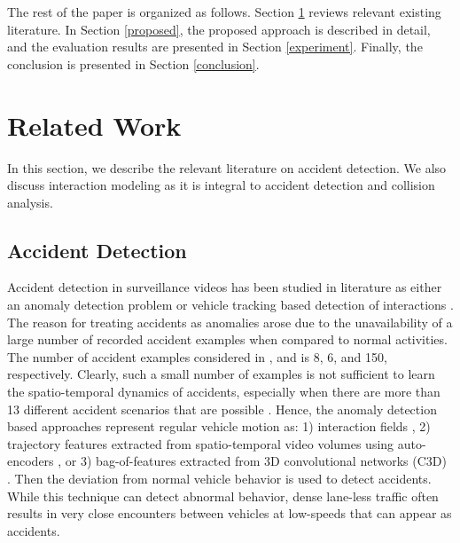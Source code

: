 \documentclass[final,journal]{IEEEtran}
\begin{document}
The rest of the paper is organized as follows. Section \ref{related} reviews relevant existing literature. In Section \ref{proposed}, the proposed approach is described in detail, and the evaluation results are presented in Section \ref{experiment}. Finally, the conclusion is presented in Section \ref{conclusion}.

\section{Related Work}\label{related}

In this section, we describe the relevant literature on accident detection. We also discuss interaction modeling as it is integral to accident detection and collision analysis.

\subsection{Accident Detection}
Accident detection in surveillance videos has been studied in literature as either an anomaly detection problem \cite{accident_anomaly3,accident_anomaly2, accident_anomaly1} or vehicle tracking based detection of interactions \cite{anticipating1, cadp, accident_anticipating2}. The reason for treating accidents as anomalies arose due to the unavailability of a large number of recorded accident examples when compared to normal activities. The number of accident examples considered in \cite{accident_anomaly3}, \cite{accident_anomaly2} and \cite{accident_anomaly1} is 8, 6, and 150, respectively. Clearly, such a small number of examples is not sufficient to learn the spatio-temporal dynamics of accidents, especially when there are more than 13 different accident scenarios that are possible \cite{accidenttypes}.  Hence, the anomaly detection based approaches represent regular vehicle motion as: 1) interaction fields \cite{accident_anomaly3}, 2) trajectory features extracted from spatio-temporal video volumes using auto-encoders \cite{accident_anomaly2}, or 3) bag-of-features extracted from 3D convolutional networks (C3D) \cite{accident_anomaly1}. Then the deviation from normal vehicle behavior is used to detect accidents. While this technique can detect abnormal behavior, dense lane-less traffic often results in very close encounters between vehicles at low-speeds that can appear as accidents. 
\end{document}
